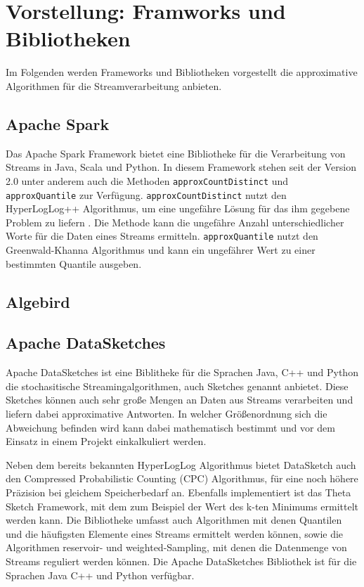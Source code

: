 \section{Vorstellung: Framworks und Bibliotheken}
Im Folgenden werden Frameworks und Bibliotheken vorgestellt die approximative Algorithmen für die Streamverarbeitung anbieten. 

\subsection{Apache Spark}
Das Apache Spark Framework bietet eine Bibliotheke für die Verarbeitung von Streams in Java, Scala und Python. 
In diesem Framework stehen seit der Version 2.0 unter anderem auch die Methoden \texttt{approxCountDistinct} 
und \texttt{approxQuantile} zur Verfügung. 
\texttt{approxCountDistinct} nutzt den HyperLogLog++ Algorithmus, 
um eine ungefähre Lösung für das ihm gegebene Problem zu liefern \cite{hunter2016}.
Die Methode kann die ungefähre Anzahl unterschiedlicher Worte für die Daten eines Streams ermitteln.
\texttt{approxQuantile} nutzt den Greenwald-Khanna Algorithmus \cite{greenwald2001} 
und kann ein ungefährer Wert zu einer bestimmten Quantile ausgeben.




\subsection{Algebird}


\subsection{Apache DataSketches}
Apache DataSketches ist eine Biblitheke für die Sprachen Java, C++ und Python die stochasitische Streamingalgorithmen, 
auch Sketches genannt anbietet. 
Diese Sketches können auch sehr große Mengen an Daten aus Streams verarbeiten 
und liefern dabei approximative Antworten. 
In welcher Größenordnung sich die Abweichung befinden wird kann dabei mathematisch bestimmt 
und vor dem Einsatz in einem Projekt einkalkuliert werden.

Neben dem bereits bekannten HyperLogLog Algorithmus bietet DataSketch auch den Compressed Probabilistic Counting (CPC) Algorithmus, 
für eine noch höhere Präzision bei gleichem Speicherbedarf an.
Ebenfalls implementiert ist das Theta Sketch Framework, 
mit dem zum Beispiel der Wert des k-ten Minimums ermittelt werden kann.
Die Bibliotheke umfasst auch Algorithmen mit denen Quantilen und die häufigsten Elemente eines Streams ermittelt werden können, 
sowie die Algorithmen reservoir- und weighted-Sampling, mit denen die Datenmenge von Streams reguliert werden können.
Die Apache DataSketches Bibliothek ist für die Sprachen Java C++ und Python verfügbar.


